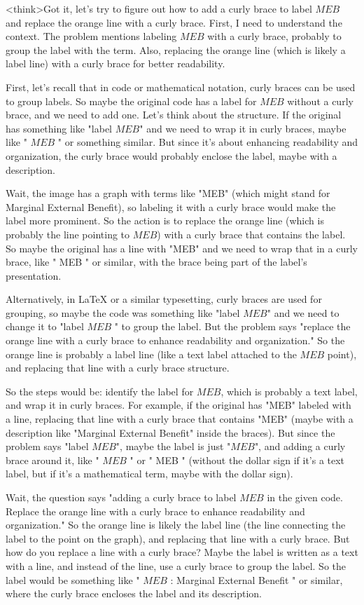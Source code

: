 <think>Got it, let's try to figure out how to add a curly brace to label $MEB$ and replace the orange line with a curly brace. First, I need to understand the context. The problem mentions labeling $MEB$ with a curly brace, probably to group the label with the term. Also, replacing the orange line (which is likely a label line) with a curly brace for better readability.

First, let's recall that in code or mathematical notation, curly braces can be used to group labels. So maybe the original code has a label for $MEB$ without a curly brace, and we need to add one. Let's think about the structure. If the original has something like "label $MEB$" and we need to wrap it in curly braces, maybe like "{ $MEB$ }" or something similar. But since it's about enhancing readability and organization, the curly brace would probably enclose the label, maybe with a description.

Wait, the image has a graph with terms like "MEB" (which might stand for Marginal External Benefit), so labeling it with a curly brace would make the label more prominent. So the action is to replace the orange line (which is probably the line pointing to $MEB$) with a curly brace that contains the label. So maybe the original has a line with "MEB" and we need to wrap that in a curly brace, like "{ MEB }" or similar, with the brace being part of the label's presentation.

Alternatively, in LaTeX or a similar typesetting, curly braces are used for grouping, so maybe the code was something like "label $MEB$" and we need to change it to "label { $MEB$ }" to group the label. But the problem says "replace the orange line with a curly brace to enhance readability and organization." So the orange line is probably a label line (like a text label attached to the $MEB$ point), and replacing that line with a curly brace structure.

So the steps would be: identify the label for $MEB$, which is probably a text label, and wrap it in curly braces. For example, if the original has "MEB" labeled with a line, replacing that line with a curly brace that contains "MEB" (maybe with a description like "Marginal External Benefit" inside the braces). But since the problem says "label $MEB$", maybe the label is just "$MEB$", and adding a curly brace around it, like "{ $MEB$ }" or "{ MEB }" (without the dollar sign if it's a text label, but if it's a mathematical term, maybe with the dollar sign).

Wait, the question says "adding a curly brace to label $MEB$ in the given code. Replace the orange line with a curly brace to enhance readability and organization." So the orange line is likely the label line (the line connecting the label to the point on the graph), and replacing that line with a curly brace. But how do you replace a line with a curly brace? Maybe the label is written as a text with a line, and instead of the line, use a curly brace to group the label. So the label would be something like "{ $MEB$ : Marginal External Benefit }" or similar, where the curly brace encloses the label and its description.

